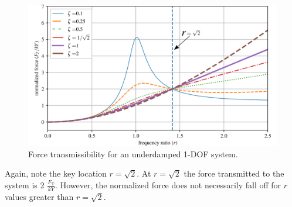 \documentclass[12pt,letter]{article}
\begin{document}
		\begin{figure}[H]
			\centering
			\includegraphics[]{../figures/base_excitation_force_transmissibility.png}
			\caption{Force transmissibility for an underdamped 1-DOF system.}
		\end{figure}
		Again, note the key location $r=\sqrt{2}$. At $r=\sqrt{2}$ the force transmitted to the system is 2 $\frac{F_\text{T}}{kY}$. However, the normalized force does not necessarily fall off for $r$ values greater than $r=\sqrt{2}$.  
\end{document}
